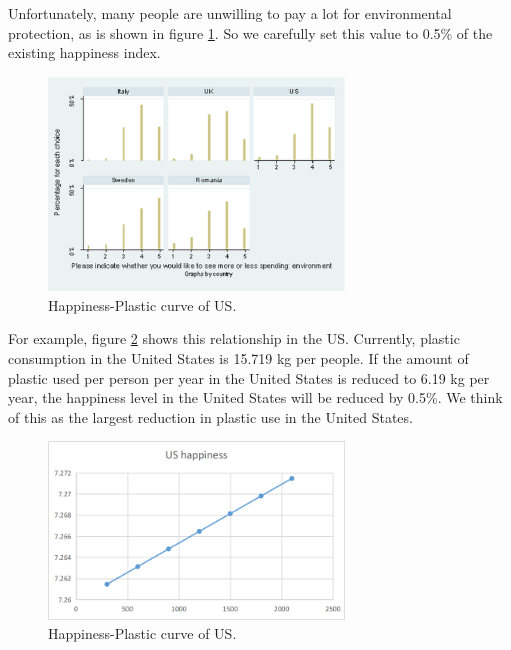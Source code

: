 \documentclass{mcmthesis}
\begin{document}
Unfortunately, many people are unwilling to pay a lot for environmental protection\cite{unf}, as is shown in figure \ref{fig3}. So we carefully set this value to 0.5\% of the existing happiness index.

\begin{figure}[!htb] %
	\centering %
	\includegraphics[width=0.7\textwidth]{figures/en.PNG} %
	\caption{Happiness-Plastic curve of US.} %
	\label{fig3} %
	
\end{figure}

For example, figure \ref{fig2} shows this relationship in the US. Currently, plastic consumption in the United States is 15.719 kg per people. If the amount of plastic used per person per year in the United States is reduced to 6.19 kg per year, the happiness level in the United States will be reduced by 0.5\%. We think of this as the largest reduction in plastic use in the United States.


\begin{figure}[!htb] %
	\centering %
	\includegraphics[width=0.7\textwidth]{figures/happiness.png} %
	\caption{Happiness-Plastic curve of US.} %
	\label{fig2} %
	
\end{figure}
\end{document}
